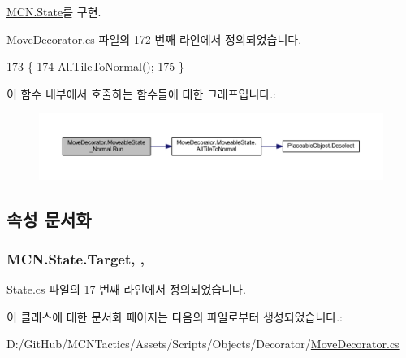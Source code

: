 \hyperlink{class_m_c_n_1_1_state_afdec72a816a8a8ec584cac758a027215}{M\+C\+N.\+State}를 구현.



Move\+Decorator.\+cs 파일의 172 번째 라인에서 정의되었습니다.


\begin{DoxyCode}
173         \{
174             \hyperlink{class_move_decorator_1_1_moveable_state_a2b63f058084f2548f8547c21715d271c}{AllTileToNormal}();
175         \}
\end{DoxyCode}


이 함수 내부에서 호출하는 함수들에 대한 그래프입니다.\+:
\nopagebreak
\begin{figure}[H]
\begin{center}
\leavevmode
\includegraphics[width=350pt]{class_move_decorator_1_1_moveable_state___normal_a9e4e591aa61c13840a15facffa2148d6_cgraph}
\end{center}
\end{figure}




\subsection{속성 문서화}
\subsubsection[{\texorpdfstring{Target}{Target}}]{ M\+C\+N.\+State.\+Target\hspace{0.3cm}{\ttfamily [get]}, {\ttfamily [protected]}, {\ttfamily [inherited]}}\hypertarget{class_m_c_n_1_1_state_a79a563b32f183c9adc9a96679fc57eb8}{}\label{class_m_c_n_1_1_state_a79a563b32f183c9adc9a96679fc57eb8}


State.\+cs 파일의 17 번째 라인에서 정의되었습니다.



이 클래스에 대한 문서화 페이지는 다음의 파일로부터 생성되었습니다.\+:\begin{DoxyCompactItemize}
\item 
D\+:/\+Git\+Hub/\+M\+C\+N\+Tactics/\+Assets/\+Scripts/\+Objects/\+Decorator/\hyperlink{_move_decorator_8cs}{Move\+Decorator.\+cs}\end{DoxyCompactItemize}
